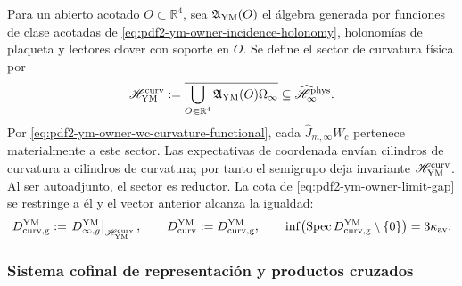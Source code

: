 Para un abierto acotado $O\subset\mathbb R^4$, sea
$\mathfrak A_{\rm YM}(O)$ el álgebra generada por funciones de clase acotadas de
\eqref{eq:pdf2-ym-owner-incidence-holonomy}, holonomías de plaqueta y lectores
clover con soporte en $O$. Se define el sector de curvatura física por
\begin{equation}\label{eq:pdf2-ym-owner-curvature-cyclic-sector}
 \mathscr H_{\rm YM}^{\rm curv}
 :=\overline{\bigcup_{O\Subset\mathbb R^4}
   \mathfrak A_{\rm YM}(O)\Omega_\infty}
 \subseteq\widehat{\mathscr H}_\infty^{\rm phys}.
\end{equation}
Por \eqref{eq:pdf2-ym-owner-wc-curvature-functional}, cada
$\widehat J_{m,\infty}W_c$ pertenece materialmente a este sector.
Las expectativas de coordenada envían cilindros de curvatura a cilindros de
curvatura; por tanto el semigrupo deja invariante
$\mathscr H_{\rm YM}^{\rm curv}$. Al ser autoadjunto, el sector es reductor. La
cota de \eqref{eq:pdf2-ym-owner-limit-gap} se restringe a él y el vector anterior
alcanza la igualdad:
\begin{equation}\label{eq:pdf2-ym-owner-curvature-sector-gap}
 D_{\rm curv,g}^{\rm YM}
 :=\left.D_{\infty,g}^{\rm YM}\right|_{\mathscr H_{\rm YM}^{\rm curv}},
 \qquad D_{\rm curv}^{\rm YM}:=D_{\rm curv,g}^{\rm YM},
 \qquad
 \inf\bigl(\operatorname{Spec}D_{\rm curv,g}^{\rm YM}\setminus\{0\}\bigr)
 =3\kappa_{\rm av}.
\end{equation}

\subsubsection{Sistema cofinal de representación y productos cruzados}

